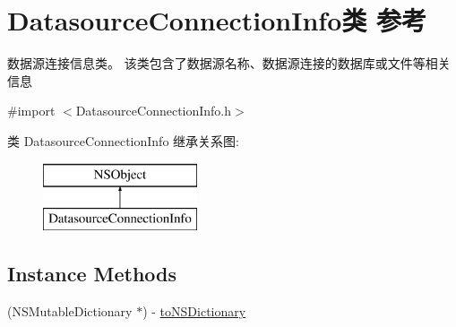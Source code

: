 \hypertarget{interface_datasource_connection_info}{\section{Datasource\-Connection\-Info类 参考}
\label{interface_datasource_connection_info}
}


数据源连接信息类。 该类包含了数据源名称、数据源连接的数据库或文件等相关信息  




{\ttfamily \#import $<$Datasource\-Connection\-Info.\-h$>$}

类 Datasource\-Connection\-Info 继承关系图\-:\begin{figure}[H]
\begin{center}
\leavevmode
\includegraphics[height=2.000000cm]{interface_datasource_connection_info}
\end{center}
\end{figure}
\subsection*{Instance Methods}
\begin{DoxyCompactItemize}
\item 
(N\-S\-Mutable\-Dictionary $\ast$) -\/ \hyperlink{interface_datasource_connection_info_a0ceff303c12fb308fcdd18f5882d17e0}{to\-N\-S\-Dictionary}
\end{DoxyCompactItemize}
